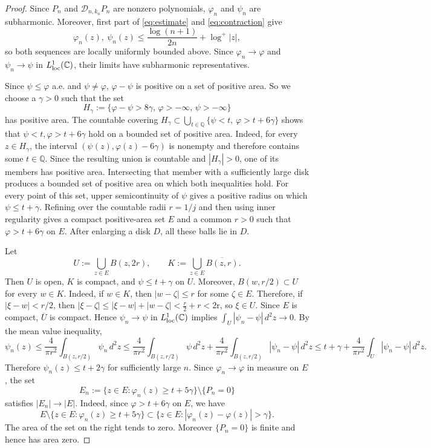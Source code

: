\documentclass[10pt,reqno]{amsart}
\theoremstyle{remark}
\newcommand{\C}{\mathbb C}
\begin{document}
\begin{proof}
    Since $P_n$ and $\mathcal D_{n,k_n}P_n$ are nonzero polynomials, $\varphi_n$ and $\psi_n$ are subharmonic. Moreover, first part of \eqref{eq:estimate} and \eqref{eq:contraction} give
    \[\varphi_n(z),\ \psi_n(z)
    \le \frac{\log(n+1)}{2n}+\log^+|z|,\]
    so both sequences are locally uniformly bounded above. Since $\varphi_n\to\varphi$ and $\psi_n\to\psi$ in $L^1_{\rm loc}(\C)$, their limits have subharmonic representatives.

    Since $\psi\le \varphi$ a.e. and $\psi\ne \varphi$, $\varphi-\psi$ is positive on a set of positive area. So we choose a $\gamma>0$ such that the set 
    \[H_\gamma:=\{\varphi-\psi>8\gamma,\, \varphi>-\infty,\,\psi>-\infty\}\]
    has positive area. The countable covering $H_\gamma\subset \bigcup_{t\in \mathbb Q}\{\psi<t,\,\varphi>t+6\gamma\}$ shows that $\psi<t,\varphi>t+6\gamma$ hold on a bounded set of positive area. Indeed, for every $z\in H_\gamma$, the interval $(\psi(z),\varphi(z)-6\gamma)$ is nonempty and therefore contains some $t\in\mathbb Q$. Since the resulting union is countable and $|H_\gamma|>0$, one of its members has positive area. Intersecting that member with a sufficiently large disk produces a bounded set of positive area on which both inequalities hold. For every point of this set, upper semicontinuity of $\psi$ gives a positive radius on which $\psi\le t+\gamma$. Refining over the countable radii $r=1/j$ and then using inner regularity gives a compact positive-area set $E$ and a common $r>0$ such that $\varphi>t+6\gamma$ on $E$. After enlarging a disk $D$, all these balls lie in $D$.

    Let
    \[U:=\bigcup_{z\in E}B(z,2r),\qquad K:=\bigcup_{z\in E}\overline{B(z,r)}.\]
    Then $U$ is open, $K$ is compact, and $\psi\le t+\gamma$ on $U$. Moreover, $B(w,r/2)\subset U$ for every $w\in K$. Indeed, if $w\in K$, then $|w-\zeta|\le r$ for some $\zeta\in E$. Therefore, if $|\xi-w|<r/2$, then $|\xi-\zeta|\le|\xi-w|+|w-\zeta|<\frac r2+r<2$r, so $\xi\in U$. Since $E$ is compact, $\overline{U}$ is compact. Hence $\psi_n\to \psi$ in $L_{\rm loc}^1(\C)$ implies $\int_U |\psi_n-\psi|\,d^2z\to 0$. By the mean value inequality,
    \[\psi_n(z)\le\frac{4}{\pi r^2}\int_{B(z,r/2)}\psi_n\,d^2z
    \le \frac{4}{\pi r^2}\int_{B(z,r/2)}\psi\,d^2z+\frac{4}{\pi r^2}\int_{B(z,r/2)}|\psi_n-\psi|\,d^2z
    \le t+\gamma+\frac{4}{\pi r^2}\int_{U}|\psi_n-\psi|\,d^2z.\]
    Therefore $\psi_n(z)\le t+2\gamma$ for sufficiently large $n$.
    Since $\varphi_n\to\varphi$ in measure on $E$, the set
    \[E_n:=\{z\in E:\varphi_n(z)\ge t+5\gamma\}\setminus\{P_n=0\}\] satisfies $|E_n|\to |E|$. Indeed, since $\varphi>t+6\gamma$ on $E$, we have 
    \[E\setminus\{z\in E:\varphi_n(z)\ge t+5\gamma\}\subset \{z\in E:|\varphi_n(z)-\varphi(z)|>\gamma\}.\]
    The area of the set on the right tends to zero. Moreover $\{P_n=0\}$ is finite and hence has area zero. 


\end{proof}
\end{document}
